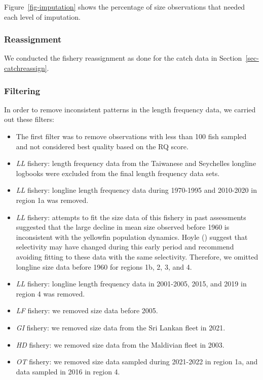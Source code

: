 \documentclass[
]{scrartcl}
\begin{document}
Figure~\ref{fig-imputation} shows the percentage of size observations
that needed each level of imputation.

\subsubsection{Reassignment}\label{reassignment}

We conducted the fishery reassignment as done for the catch data in
Section~\ref{sec-catchreassign}.

\subsubsection{Filtering}\label{filtering}

In order to remove inconsistent patterns in the length frequency data,
we carried out these filters:

\begin{itemize}
\item
  The first filter was to remove observations with less than 100 fish
  sampled and not considered best quality based on the RQ score.
\item
  \emph{LL} fishery: length frequency data from the Taiwanese and
  Seychelles longline logbooks were excluded from the final length
  frequency data sets.
\item
  \emph{LL} fishery: longline length frequency data during 1970-1995 and
  2010-2020 in region 1a was removed.
\item
  \emph{LL} fishery: attempts to fit the size data of this fishery in
  past assessments suggested that the large decline in mean size
  observed before 1960 is inconsistent with the yellowfin population
  dynamics. Hoyle () suggest
  that selectivity may have changed during this early period and
  recommend avoiding fitting to these data with the same selectivity.
  Therefore, we omitted longline size data before 1960 for regions 1b,
  2, 3, and 4.
\item
  \emph{LL} fishery: longline length frequency data in 2001-2005, 2015,
  and 2019 in region 4 was removed.
\item
  \emph{LF} fishery: we removed size data before 2005.
\item
  \emph{GI} fishery: we removed size data from the Sri Lankan fleet in
  2021.
\item
  \emph{HD} fishery: we removed size data from the Maldivian fleet in
  2003.
\item
  \emph{OT} fishery: we removed size data sampled during 2021-2022 in
  region 1a, and data sampled in 2016 in region 4.
\end{itemize}
\end{document}
